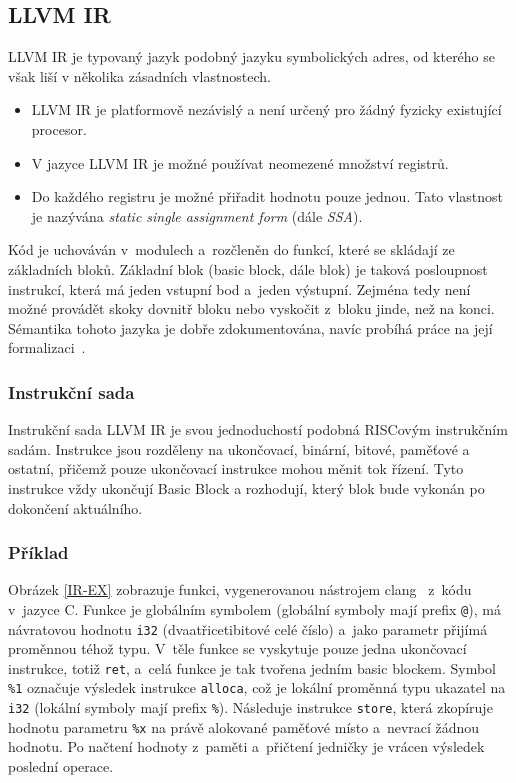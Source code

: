 \documentclass[10pt,a4paper,notitlepage]{report}
\begin{document}
\subsection{LLVM IR}
LLVM IR je typovaný jazyk podobný jazyku symbolických adres, od kterého se však liší v několika zásadních vlastnostech.
\begin{itemize}
\item LLVM IR je platformově nezávislý a není určený pro žádný fyzicky existující procesor.
\item V jazyce LLVM IR je možné používat neomezené množství registrů.
\item Do každého registru je možné přiřadit hodnotu pouze jednou. Tato vlastnost je nazývána \textit{static single assignment form} (dále \textit{SSA}).
\end{itemize}
Kód je uchováván v~modulech a~rozčleněn do funkcí, které se skládají ze základních bloků. Základní blok (basic block, dále blok) je taková posloupnost instrukcí, která má jeden vstupní bod a~jeden výstupní. Zejména tedy není možné provádět skoky dovnitř bloku nebo vyskočit z~bloku jinde, než na konci. Sémantika tohoto jazyka je dobře zdokumentována, navíc probíhá práce na její formalizaci~\cite{LLVMForm}.

\subsubsection{Instrukční sada}
Instrukční sada LLVM IR je svou jednoduchostí podobná RISCovým instrukčním sadám. Instrukce jsou rozděleny na ukončovací, binární, bitové, paměťové a ostatní, přičemž pouze ukončovací instrukce mohou měnit tok řízení. Tyto instrukce vždy ukončují Basic Block a rozhodují, který blok bude vykonán po dokončení aktuálního.

\subsubsection{Příklad}
Obrázek \ref{IR-EX} zobrazuje funkci, vygenerovanou nástrojem clang~\cite{clang} z~kódu v~jazyce C. Funkce je globálním symbolem (globální symboly mají prefix \texttt{@}), má návratovou hodnotu \texttt{i32} (dvaatřicetibitové celé číslo) a~jako parametr přijímá proměnnou téhož typu. V~těle funkce se vyskytuje pouze jedna ukončovací instrukce, totiž \texttt{ret}, a~celá funkce je tak tvořena jedním basic blockem. Symbol \texttt{\%1} označuje výsledek instrukce \texttt{alloca}, což je lokální proměnná typu ukazatel na \texttt{i32} (lokální symboly mají prefix \texttt{\%}). Následuje instrukce \texttt{store}, která zkopíruje hodnotu parametru \texttt{\%x} na právě alokované paměťové místo a~nevrací žádnou hodnotu. Po načtení hodnoty z~paměti a~přičtení jedničky je vrácen výsledek poslední operace.
\end{document}
